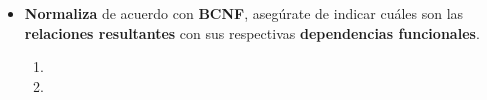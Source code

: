 \begin{itemize}
    \item \textbf{Normaliza} de acuerdo con \textbf{BCNF}, asegúrate de indicar cuáles son las \textbf{relaciones resultantes} con sus respectivas \textbf{dependencias funcionales}. \vspace{.3cm}
    
    \begin{enumerate}[label=\alph*.]
        \item \vspace{.2cm}
        \item \vspace{.2cm}
    \end{enumerate}
    \vspace{.3cm}
    

\end{itemize}